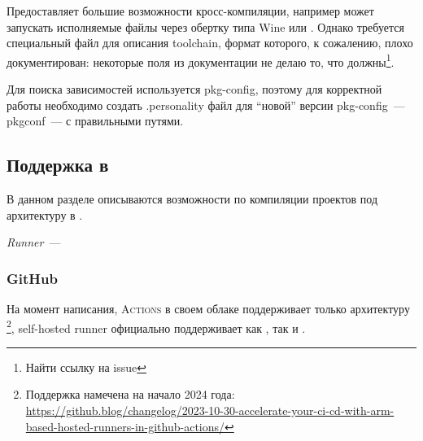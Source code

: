 Предоставляет большие возможности кросс-компиляции, например может запускать исполняемые файлы через обертку типа Wine или \qemu{}.
Однако требуется специальный файл для описания toolchain, формат которого, к сожалению, плохо документирован: некоторые поля из документации не делаю то, что должны\footnote{Найти ссылку на issue}.

Для поиска зависимостей используется pkg-config, поэтому для корректной работы необходимо создать .personality файл для \enquote{новой} версии pkg-config~--- pkgconf~--- с правильными путями.


\subsection{Поддержка в \ci{}}

В данном разделе описываются возможности по компиляции проектов под архитектуру \riscv{} в \ci{}.

\begin{definition}[Runner]
	\textit{Runner}~--- 
\end{definition}


\subsubsection{GitHub}

На момент написания, \GitHub{} \textsc{Actions} в своем облаке поддерживает только архитектуру \amd{}\footnote{Поддержка \arm{} намечена на начало 2024 года: \url{https://github.blog/changelog/2023-10-30-accelerate-your-ci-cd-with-arm-based-hosted-runners-in-github-actions/}}, self-hosted runner официально поддерживает как \amd{}, так и \arm{}.

